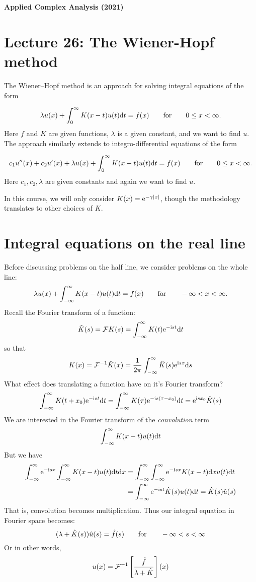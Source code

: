 \documentclass[12pt,landscape]{article}
\def\qqfor{\qquad\hbox{for}\qquad}
\def\D{ {\rm d} }
\def\I{ {\rm i} }
\def\E{ {\rm e} }
\def\dx{\D x}
\def\dt{\D t}
\def\endash{–}
\begin{document}
{\LARGE
\sf
\textbf{Applied Complex Analysis (2021)}

\section{Lecture 26: The Wiener-Hopf method}
The Wiener\ensuremath{\endash}Hopf method is an approach for solving integral equations of the form

\[
\lambda u(x) + \int_0^\infty K(x-t)u(t) \dt = f(x)\qqfor 0 \leq x < \infty.
\]
Here $f$ and $K$ are given functions, $\lambda$ is a given constant, and we want to find $u$. The approach similarly extends to integro-differential equations of the form

\[
c_1 u''(x) + c_2 u'(x) + \lambda u(x) + \int_0^\infty K(x-t)u(t) \dt = f(x)\qqfor 0 \leq x < \infty.
\]
Here $c_1, c_2, \lambda$ are given constants and again we want to find $u$.

In this course, we will only consider $K(x) = \E^{-\gamma |x|}$, though the methodology translates to other choices of $K$.
\newpage
\section{Integral equations on the real line}
Before discussing problems on the half line, we consider problems on the whole line:
\[
\lambda u(x) + \int_{-\infty}^\infty K(x-t)u(t) \dt = f(x)\qqfor -\infty < x < \infty.
\]
Recall the Fourier transform of a function:
\[
    {\hat{K}}(s) = {\cal F} K (s) =  \int_{-\infty}^\infty K(t) \E^{-\I s t} \dt
\]
so that
\[
K(x) = {\cal F}^{-1} \hat K(x) =  {1 \over 2\pi}\int_{-\infty}^\infty \hat K(s) \E^{ \I s x} \D s
\]
What effect does translating a function have on it's Fourier transform?
\[
\int_{-\infty}^\infty K(t+x_0) \E^{-\I s t} \dt = \int_{-\infty}^\infty K(\tau) \E^{-\I s (\tau - x_0)} \dt = \E^{\I s x_0} \hat K(s)
\]
We are interested in the  Fourier transform of the \emph{convolution} term
\[
\int_{-\infty}^\infty K(x-t)u(t) \dt
\]
But we have
\begin{align*}
\int_{-\infty}^\infty \E^{-\I s x} \int_{-\infty}^\infty K(x-t)u(t) \dt \dx & = \int_{-\infty}^\infty \int_{-\infty}^\infty \E^{-\I s x} K(x-t)\dx u(t) \dt \\
& =
\int_{-\infty}^\infty \E^{-\I s t} \hat K(s) u(t) \dt = \hat K(s) \hat u(s)
\end{align*}
That is, convolution becomes multiplication. Thus our integral equation in Fourier space becomes:
\[
(\lambda + \hat K(s)) \hat u(s) = \hat f(s) \qqfor -\infty < s < \infty
\]
Or in other words,
\[
u(x) = {\cal F}^{-1} \left[{\hat f \over \lambda + \hat K }\right](x)
\]
}
\end{document}
